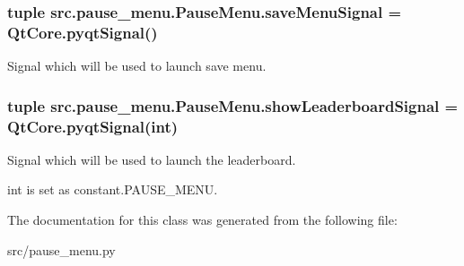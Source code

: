 \hypertarget{classsrc_1_1pause__menu_1_1_pause_menu_a48613202c1a9051758755bf8fcdd2ecc}{}
\subsubsection[{save\+Menu\+Signal}]{\setlength{\rightskip}{0pt plus 5cm}tuple src.\+pause\+\_\+menu.\+Pause\+Menu.\+save\+Menu\+Signal = Qt\+Core.\+pyqt\+Signal()\hspace{0.3cm}{\ttfamily [static]}}\label{classsrc_1_1pause__menu_1_1_pause_menu_a48613202c1a9051758755bf8fcdd2ecc}


Signal which will be used to launch save menu. 

\hypertarget{classsrc_1_1pause__menu_1_1_pause_menu_abaa0c6d5831d9bfb1d99d7431e47a981}{}
\subsubsection[{show\+Leaderboard\+Signal}]{\setlength{\rightskip}{0pt plus 5cm}tuple src.\+pause\+\_\+menu.\+Pause\+Menu.\+show\+Leaderboard\+Signal = Qt\+Core.\+pyqt\+Signal(int)\hspace{0.3cm}{\ttfamily [static]}}\label{classsrc_1_1pause__menu_1_1_pause_menu_abaa0c6d5831d9bfb1d99d7431e47a981}


Signal which will be used to launch the leaderboard. 

int is set as \textquotesingle{}constant.\+P\+A\+U\+S\+E\+\_\+\+M\+E\+N\+U\textquotesingle{}. 

The documentation for this class was generated from the following file\+:\begin{DoxyCompactItemize}
\item 
src/pause\+\_\+menu.\+py\end{DoxyCompactItemize}
